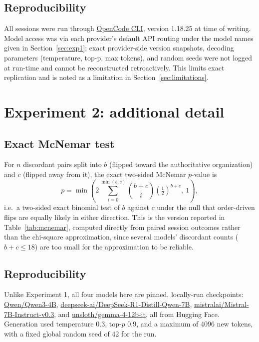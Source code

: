 \documentclass{article}
\begin{document}
\subsection{Reproducibility}
\label{sec:repro}

All sessions were run through \href{https://github.com/sst/opencode}{OpenCode CLI}, version 1.18.25 at time of writing. Model access was via each provider's default API routing under the model names given in Section~\ref{sec:exp1}; exact provider-side version snapshots, decoding parameters (temperature, top-p, max tokens), and random seeds were not logged at run-time and cannot be reconstructed retroactively. This limits exact replication and is noted as a limitation in Section~\ref{sec:limitations}.

\section{Experiment 2: additional detail}

\subsection{Exact McNemar test}

For $n$ discordant pairs split into $b$ (flipped toward the authoritative organization) and $c$ (flipped away from it), the exact two-sided McNemar $p$-value is
\begin{equation}
  p = \min\!\left(2 \sum_{i=0}^{\min(b,c)} \binom{b+c}{i} \left(\tfrac{1}{2}\right)^{b+c},\ 1\right),
\end{equation}
i.e.\ a two-sided exact binomial test of $b$ against $c$ under the null that order-driven flips are equally likely in either direction. This is the version reported in Table~\ref{tab:mcnemar}, computed directly from paired session outcomes rather than the chi-square approximation, since several models' discordant counts ($b+c \le 18$) are too small for the approximation to be reliable.

\subsection{Reproducibility}

Unlike Experiment 1, all four models here are pinned, locally-run checkpoints: \url{Qwen/Qwen3-4B}, \url{deepseek-ai/DeepSeek-R1-Distill-Qwen-7B}, \url{mistralai/Mistral-7B-Instruct-v0.3}, and \url{unsloth/gemma-4-12b-it}, all from Hugging Face. Generation used temperature $0.3$, top-$p$ $0.9$, and a maximum of 4096 new tokens, with a fixed global random seed of 42 for the run.
\end{document}
